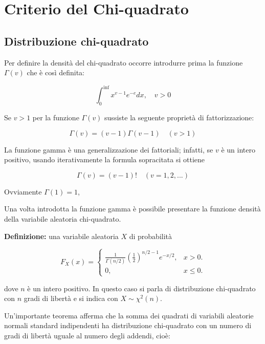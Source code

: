 {}



\chapter{Criterio del Chi-quadrato}

\section{Distribuzione chi-quadrato}

Per definire la densità del chi-quadrato occorre introdurre prima la funzione $\Gamma(v)$ che è così definita:

\[\int_{0}^{\inf}x^{v-1}e^{-e}dx, \quad v>0\]

Se $v>1$ per la funzione $\Gamma(v)$ sussiste la seguente proprietà di fattorizzazione:

\[\Gamma(v) = (v-1)\Gamma(v-1) \quad (v>1)\]

La funzione gamma è una generalizzazione dei fattoriali; infatti, se $v$ è un intero positivo, usando iterativamente la formula sopracitata si ottiene

\[\Gamma(v) = (v-1)! \quad (v = 1, 2, ...)\]

Ovviamente $\Gamma(1) = 1$,

Una volta introdotta la funzione gamma è possibile presentare la funzione densità della variabile aleatoria chi-quadrato.

\noindent \textbf{Definizione:} una variabile aleatoria $X$ di probabilità

\[F_X(x) = \begin{cases}
    \frac{1}{\Gamma(n/2)}(\frac{1}{2})^{n/2-1}e^{-x/2}, & x>0.\\
    0, & x \leq 0.
    \end{cases}
    \]

dove $n$ è un intero positivo. In questo caso si parla di distribuzione chi-quadrato con $n$ gradi di libertà e si indica con $X \sim \chi^2(n)$.

Un'importante teorema afferma che la somma dei quadrati di variabili aleatorie normali standard indipendenti ha distribuzione chi-quadrato con un numero di gradi di libertà uguale al numero degli addendi, cioè:

